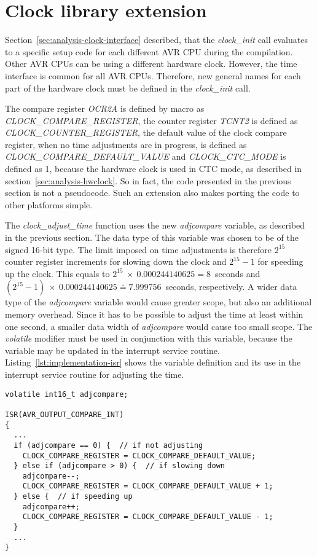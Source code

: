 
\section{Clock library extension}\label{sec:implementation-clock}
Section~\ref{sec:analysis-clock-interface} described, that
the {\it{clock\_init}} call evaluates to a specific setup code
for each different AVR CPU during the compilation.
Other AVR CPUs can be using a different hardware clock.
However, the time interface is common for all AVR CPUs.
Therefore, new general names for each part of the hardware clock
must be defined in the {\it{clock\_init}} call.

The compare register {\it{OCR2A}} is defined by macro as {\it{CLOCK\_COMPARE\_REGISTER}},
the counter register {\it{TCNT2}} is defined as {\it{CLOCK\_COUNTER\_REGISTER}},
the default value of the clock compare register, when no time adjustments are in progress,
is defined as {\it{CLOCK\_COMPARE\_DEFAULT\_VALUE}}
and {\it{CLOCK\_CTC\_MODE}} is defined as 1, because the hardware clock is used in CTC mode,
as described in section~\ref{sec:analysis-hwclock}.
So in fact, the code presented in the previous section is not a pseudocode.
Such an extension also makes porting the code to other platforms simple.

The {\it{clock\_adjust\_time}} function uses the new {\it{adjcompare}} variable,
as described in the previous section.
The data type of this variable was chosen to be of the signed 16-bit type.
The limit imposed on time adjustments is therefore $2^{15}$ counter register increments
for slowing down the clock and $2^{15}-1$ for speeding up the clock.
This equals to $2^{15}~\times~0.000244140625 = 8$~seconds
and $(2^{15} - 1)~\times~0.000244140625 \doteq 7.999756$~seconds, respectively.
A wider data type of the {\it{adjcompare}} variable would cause greater scope,
but also an additional memory overhead.
Since it has to be possible to adjust the time at least within one second,
a smaller data width of {\it{adjcompare}} would cause too small scope.
The {\it{volatile}} modifier must be used in conjunction with this variable,
because the variable may be updated in the interrupt service routine.
Listing~\ref{lst:implementation-isr} shows the variable definition
and its use in the interrupt service routine for adjusting the time.
\begin{lstlisting}[caption={Pseudocode of adjustments in interrupt service routine},label={lst:implementation-isr}]
volatile int16_t adjcompare;

ISR(AVR_OUTPUT_COMPARE_INT)
{
  ...
  if (adjcompare == 0) {  // if not adjusting
    CLOCK_COMPARE_REGISTER = CLOCK_COMPARE_DEFAULT_VALUE;
  } else if (adjcompare > 0) {  // if slowing down
    adjcompare--;
    CLOCK_COMPARE_REGISTER = CLOCK_COMPARE_DEFAULT_VALUE + 1;
  } else {  // if speeding up
    adjcompare++;
    CLOCK_COMPARE_REGISTER = CLOCK_COMPARE_DEFAULT_VALUE - 1;
  }
  ...
}
\end{lstlisting}

